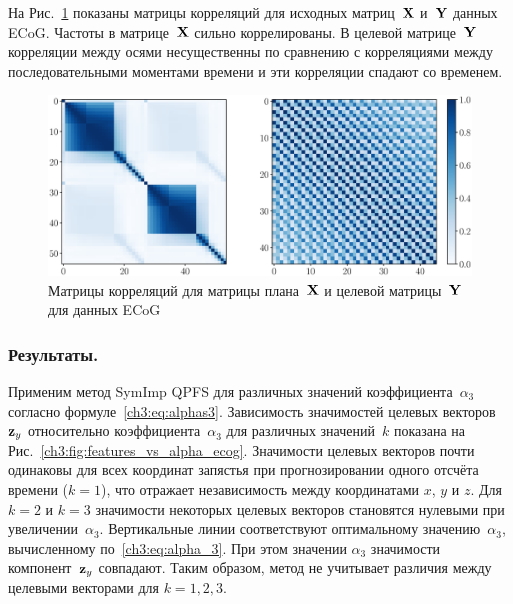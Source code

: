 На Рис.~\ref{ch3:fig:corr_matrix} показаны матрицы корреляций для исходных матриц~$\mathbf{X}$ и~$\mathbf{Y}$ данных ECoG. Частоты в матрице~$\mathbf{X}$ сильно коррелированы. 
В целевой матрице~$\mathbf{Y}$ корреляции между осями несущественны по сравнению с корреляциями между последовательными моментами времени и эти корреляции спадают со временем.
\begin{figure}[ht]
	\includegraphics[width=\linewidth]{figs/ch3/corr_matrix}
	\caption{Матрицы корреляций для матрицы плана~$\mathbf{X}$ и целевой матрицы~$\mathbf{Y}$ для данных ECoG}
	\label{ch3:fig:corr_matrix}
\end{figure}

\subsubsection{Результаты.}
Применим метод SymImp QPFS для различных значений коэффициента~$\alpha_3$ согласно формуле~\eqref{ch3:eq:alphas3}.
Зависимость значимостей целевых векторов~$\mathbf{z}_y$ относительно коэффициента~$\alpha_3$ для различных значений~$k$ показана на Рис.~\ref{ch3:fig:features_vs_alpha_ecog}.
Значимости целевых векторов почти одинаковы для всех координат запястья при прогнозировании одного отсчёта времени ($k = 1$), 
что отражает независимость между координатами $x$, $y$ и $z$.
Для $k = 2$ и $k = 3$ значимости некоторых целевых векторов становятся нулевыми при увеличении~$\alpha_3$.
Вертикальные линии соответствуют оптимальному значению~$\alpha_3$, вычисленному по~\eqref{ch3:eq:alpha_3}. 
При этом значении $\alpha_3$ значимости компонент~$\mathbf{z}_y$ совпадают. 
Таким образом, метод не учитывает различия между целевыми векторами для $k=1, 2, 3$.

